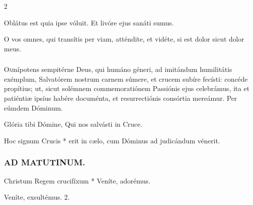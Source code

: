 \documentclass[9pt,twoside]{extarticle}
\begin{document}
\begin{multicols}{2}
\begin{tightlist}{}
\item {} Oblátus est quia ipse vóluit.  Et livóre ejus sanáti sumus.
\item {} O vos omnes, qui transítis per viam, atténdite, et vidéte, si est dolor sicut dolor meus.
\end{tightlist}

\subsubsection*{\center{}}
\lettrine{O}mnípotens sempitérne Deus, qui humáno géneri, ad imitándum humilitátis exémplum, Salvatórem nostrum carnem súmere, et crucem subíre fecísti: concéde propítius; ut, sicut solémnem commemoratiónem Passiónis ejus celebrámus, ita et patiéntiæ ipsíus habére documénta, et resurrectiónis consórtia mereámur. Per eúmdem Dóminum.

\begin{tightlist}{}
\item {} Glória tibi Dómine, Qui nos salvásti in Cruce.
\item {} Hoc signum Crucis * erit in cælo, cum Dóminus ad judicándum vénerit.
\end{tightlist}

\subsubsection*{\center \textsc{AD MATUTINUM.}}
\begin{tightlist}{}
\item {} Christum Regem crucifíxum * Veníte, adorémus.
\item {} Veníte, exsultémus. 2. 
\end{tightlist}

\end{multicols}
\end{document}
